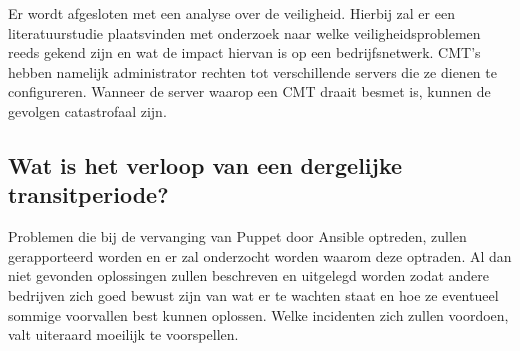 Er wordt afgesloten met een analyse over de veiligheid. Hierbij zal er een literatuurstudie plaatsvinden met onderzoek naar welke veiligheidsproblemen reeds gekend zijn en wat de impact hiervan is op een bedrijfsnetwerk. CMT's hebben namelijk  administrator rechten tot verschillende servers die ze dienen te configureren. Wanneer de server waarop een CMT draait besmet is, kunnen de gevolgen catastrofaal zijn.

\subsection{Wat is het verloop van een dergelijke transitperiode?}

Problemen die bij de vervanging van Puppet door Ansible optreden, zullen gerapporteerd worden en er zal onderzocht worden waarom deze optraden. Al dan niet gevonden oplossingen zullen beschreven en uitgelegd worden zodat andere bedrijven zich goed bewust zijn van wat er te wachten staat en hoe ze eventueel sommige voorvallen best kunnen oplossen. Welke incidenten zich zullen voordoen, valt uiteraard moeilijk te voorspellen. 




